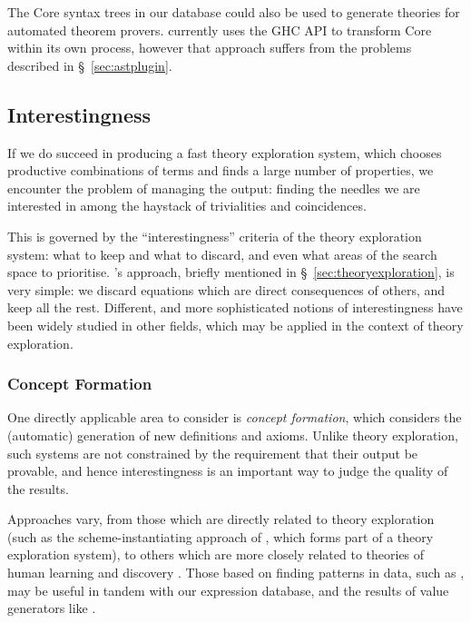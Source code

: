 The Core syntax trees in our database could also be used to generate theories
for automated theorem provers. \hipspec{} currently uses the GHC API to transform
Core within its own process, however that approach suffers from the problems
described in \S~\ref{sec:astplugin}.

\subsection{Interestingness}

If we do succeed in producing a fast theory exploration system, which chooses
productive combinations of terms and finds a large number of properties, we
encounter the problem of managing the output: finding the needles we are
interested in among the haystack of trivialities and coincidences.

This is governed by the ``interestingness'' criteria of the theory exploration
system: what to keep and what to discard, and even what areas of the search
space to prioritise. \quickspec{}'s approach, briefly mentioned in
\S~\ref{sec:theoryexploration}, is very simple: we discard equations which are
direct consequences of others, and keep all the rest. Different, and more
sophisticated notions of interestingness have been widely studied in other
fields, which may be applied in the context of theory exploration.

\subsubsection{Concept Formation} \label{sec:conceptformation} \leavevmode \newline

One directly applicable area to consider is \emph{concept formation}, which
considers the (automatic) generation of new definitions and axioms. Unlike
theory exploration, such systems are not constrained by the requirement that
their output be provable, and hence interestingness is an important way to judge
the quality of the results.

Approaches vary, from those which are directly related to theory exploration
(such as the scheme-instantiating approach of
\cite{Montano-Rivas.McCasland.Dixon.ea:2012}, which forms part of a theory
exploration system), to others which are more closely related to theories of
human learning and discovery \cite{Piantadosi.Tenenbaum.Goodman:2012,
  mullerunderstanding}. Those based on finding patterns in data, such as
\cite{Wille:2005}, may be useful in tandem with our expression database, and
the results of value generators like \quickcheck{}.


